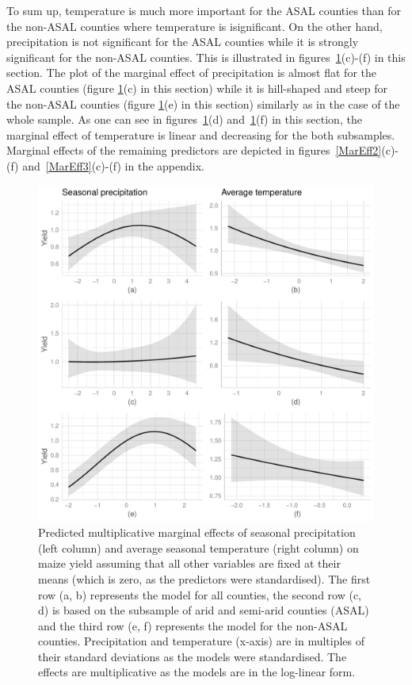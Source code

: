 \documentclass[12pt]{iopart}
\begin{document}
To sum up, temperature is much more important for the ASAL counties than for the non-ASAL counties where temperature is isignificant. On the other hand, precipitation is not significant for the ASAL counties while it is strongly significant for the non-ASAL counties. This is illustrated in figures~\ref{MarEff1}(c)-(f) in this section. The plot of the marginal effect of precipitation is almost flat for the ASAL counties (figure \ref{MarEff1}(c) in this section) while it is hill-shaped and steep for the non-ASAL counties (figure \ref{MarEff1}(e) in this section) similarly as in the case of the whole sample. As one can see in figures~\ref{MarEff1}(d) and~\ref{MarEff1}(f) in this section, the marginal effect of temperature is linear and decreasing for the both subsamples. Marginal effects of the remaining predictors are depicted in figures~\ref{MarEff2}(c)-(f) and~\ref{MarEff3}(c)-(f) in the appendix.


  \begin{figure}%
    \includegraphics{Figure1a_1f.pdf}
\caption{Predicted multiplicative marginal effects of seasonal precipitation (left column) and average seasonal temperature (right column) on maize yield assuming that all other variables are fixed at their means (which is zero, as the predictors were standardised). The first row (a, b) represents the model for all counties, the second row (c, d) is based on the subsample of arid and semi-arid counties (ASAL) and the third row (e, f) represents the model for the non-ASAL counties. Precipitation and temperature (x-axis) are in multiples of their standard deviations as the models were standardised. The effects are multiplicative as the models are in the log-linear form.}\label{MarEff1}
\end{figure}
\end{document}

